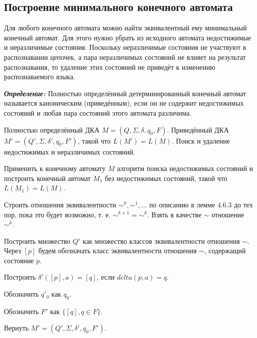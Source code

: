 \subsection*{Построение минимального конечного автомата}
Для любого конечного автомата можно найти эквивалентный ему минимальный конечный автомат. Для этого нужно убрать из исходного автомата недостижимые и неразличимые состояния. Поскольку неразличимые состояния не участвуют в распознавании цепочек, а пара неразличимых состояний не влияет на результат распознавания, то удаление этих состояний не приведёт к изменению распознаваемого языка.

\textbf{\textit{Определение:}} Полностью определённый детерминированный конечный автомат называется каноническим (приведённым), если он не содержит недостижимых состояний и любая пара состояний этого автомата различима.

{
	Полностью определённый ДКА $M = (Q,\Sigma, \delta, q_0, F)$.
}
{
	Приведённый ДКА $M' = (Q',\Sigma, \delta', q_0, F')$, такой что $L(M') = L(M)$.
}
{
	Поиск и удаление недостижимых и неразличимых состояний.
}
{
\item Применить к конечному автомату $M$ алгоритм поиска недостижимых состояний и построить конечный автомат $M_1$ без недостижимых состояний, такой что $L(M_1) = L(M)$.
\item Строить отношения эквивалентности $\sim^0, \sim^1, \ldots $ по описанию в лемме $4.6.3$ до тех пор, пока это будет возможно, т. е. $\sim^{k+1} = \sim^{k}$. Взять в качестве $\sim$ отношение $\sim^k$.
\item Построить множество $Q'$ как множество классов эквивалентности отношения $\sim$. Через $[p]$ будем обозначать класс эквивалентности отношения $\sim$, содержащий состояние $p$.
\item Построить $\delta'([p], a) = [q]$, если $delta(p,a) = q$.
\item Обозначить $q'_0$ как $q_0$.
\item Обозначить $F'$ как $\{ [q], q \in F \}$.
\item Вернуть  $M' = (Q',\Sigma, \delta', q_0, F')$.
}

